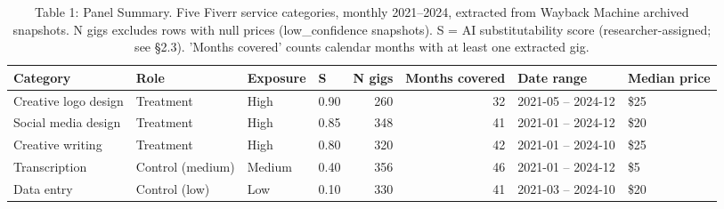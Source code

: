 \begin{table}[htbp]
\centering
\caption{Table 1: Panel Summary. Five Fiverr service categories, monthly 2021–2024, extracted from Wayback Machine archived snapshots. N gigs excludes rows with null prices (low_confidence snapshots). S = AI substitutability score (researcher-assigned; see §2.3). 'Months covered' counts calendar months with at least one extracted gig.}
\label{tab:table1_panel_summary}
\begin{tabular}{llllrrll}
\toprule
Category & Role & Exposure & S & N gigs & Months covered & Date range & Median price \\
\midrule
Creative logo design & Treatment & High & 0.90 & 260 & 32 & 2021-05 – 2024-12 & \$25 \\
Social media design & Treatment & High & 0.85 & 348 & 41 & 2021-01 – 2024-12 & \$20 \\
Creative writing & Treatment & High & 0.80 & 320 & 42 & 2021-01 – 2024-10 & \$25 \\
Transcription & Control (medium) & Medium & 0.40 & 356 & 46 & 2021-01 – 2024-12 & \$5 \\
Data entry & Control (low) & Low & 0.10 & 330 & 41 & 2021-03 – 2024-10 & \$20 \\
\bottomrule
\end{tabular}
\end{table}

